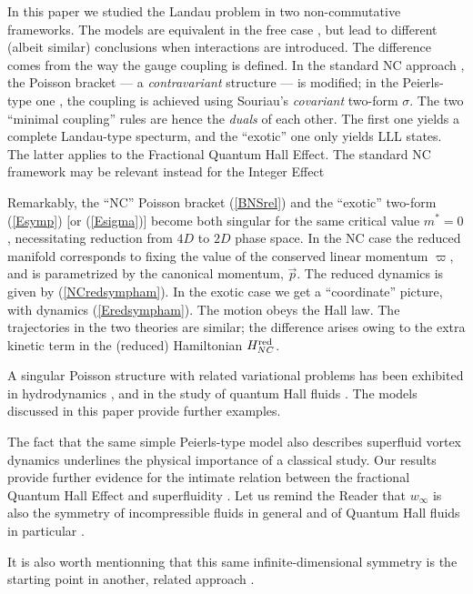 \documentclass[a4paper,11pt]{article}
\newcommand{\red}{{\rm red}}
\def\vp{{\vec p}}
\begin{document}
In this paper we studied the Landau problem in
two  non-commutative frameworks. The models
are equivalent in the free case \cite{DH},
but lead to different (albeit similar)  conclusions when interactions
are introduced.
The difference comes from the way the gauge coupling is defined.
In the standard NC approach \cite{BNS, NaPo, GAMB},
the Poisson bracket ---  a {\it contravariant} structure --- is modified;
in the Peierls-type one \cite{DJT, DuJa, DH}, the coupling is achieved
using Souriau's {\it covariant} two-form $\sigma$.
The two ``minimal coupling'' rules are hence the {\it duals} of each other.
The first one yields a complete Landau-type specturm, and the  ``exotic''
one only yields LLL states.
The latter applies to
the Fractional Quantum Hall Effect. The standard NC framework may be
relevant instead for the Integer Effect \cite{QHE, MorPo}
\goodbreak

  Remarkably, the ``NC'' Poisson bracket
(\ref{BNSrel}) and the ``exotic'' two-form (\ref{Esymp})
[or (\ref{Esigma})]
become both singular for the same critical value $m^*=0$,
necessitating reduction from $4D$ to $2D$ phase space.
In the NC case the reduced manifold corresponds to fixing the value of
the conserved linear momentum $\varpi$, and is parametrized by the
canonical momentum, $\vp$. The reduced dynamics is given by
(\ref{NCredsympham}). In the exotic case
we get a ``coordinate'' picture, with dynamics (\ref{Eredsympham}).
The motion obeys the Hall law.
The trajectories in the two theories
are similar; the difference arises owing to the
extra kinetic term in the (reduced) Hamiltonian $H_{NC}^{\red}$.

A singular Poisson structure with related variational
problems has been exhibited in hydrodynamics
\cite{JACKREV}, and in the study of
quantum Hall fluids \cite{QHF}. The models discussed in this paper
provide further examples.

The fact that the same simple Peierls-type model also describes superfluid
vortex dynamics  underlines the physical importance of a classical
study. Our results provide further evidence for the
  intimate relation between the fractional Quantum Hall Effect
and superfluidity \cite{LeMy}.
Let us remind the Reader that $w_{\infty}$ is also the symmetry of
  incompressible fluids \cite{Arnold} in general
  and of Quantum Hall fluids in particular \cite{Winfty, QHF}.

  It is also worth mentionning that
  this same infinite-dimensional symmetry is the starting point in another,
  related approach \cite{Stichel}.
\end{document}
